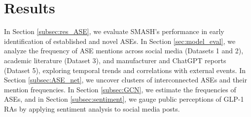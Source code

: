 \documentclass[referee,bst/sn-basic]{sn-jnl}%
\begin{document}

\section{Results}
\label{sec:res}
In Section \ref{subsec:res_ASE}, we evaluate SMASH's performance in early identification of established and novel ASEs.
In Section \ref{sec:model_eval}, we analyze the frequency of ASE mentions across social media (Datasets 1 and 2), academic literature (Dataset 3), and manufacturer and ChatGPT reports (Dataset 5), exploring temporal trends and correlations with external events.
In Section \ref{subsec:ASE_net}, we uncover clusters of interconnected ASEs and their mention frequencies. 
In Section \ref{subsec:GCN}, we estimate the frequencies of ASEs, and in Section \ref{subsec:sentiment}, we gauge public perceptions of GLP-1 RAs by applying sentiment analysis to social media posts.

\end{document}
